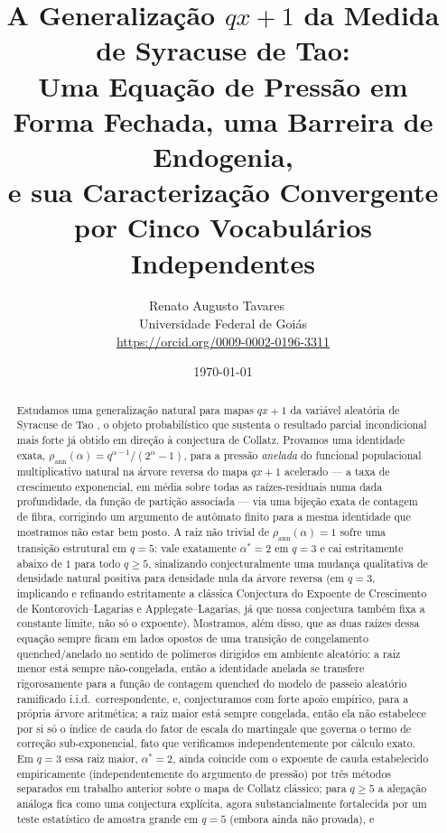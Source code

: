 \documentclass[11pt]{article}
\title{A Generalização $qx+1$ da Medida de Syracuse de Tao:\\
Uma Equação de Pressão em Forma Fechada, uma Barreira de Endogenia,\\
e sua Caracterização Convergente por Cinco Vocabulários Independentes}
\author{Renato Augusto Tavares~{\small\href{mailto:dr.renatotavares@gmail.com}{\textcolor{black}{\faEnvelope}}}~\orcidlink{0009-0002-0196-3311}\\
\normalsize Universidade Federal de Goiás\\
\small \href{https://orcid.org/0009-0002-0196-3311}{https://orcid.org/0009-0002-0196-3311}}
\date{\today}
\theoremstyle{definition}
\theoremstyle{remark}
\begin{document}
\maketitle

\begin{abstract}
Estudamos uma generalização natural para mapas $qx+1$ da variável
aleatória de Syracuse de Tao \cite{Tao2022}, o objeto probabilístico
que sustenta o resultado parcial incondicional mais forte já obtido em
direção à conjectura de Collatz. Provamos uma identidade exata, $\rho_{\mathrm{ann}}(\alpha) =
q^{\alpha-1}/(2^\alpha-1)$, para a pressão \emph{anelada} do funcional
populacional multiplicativo natural na árvore reversa do mapa $qx+1$
acelerado --- a taxa de crescimento exponencial, em média sobre todas
as raízes-residuais numa dada profundidade, da função de partição
associada --- via uma bijeção exata de contagem de fibra, corrigindo
um argumento de autômato finito para a mesma identidade que mostramos
não estar bem posto. A raiz não trivial de $\rho_{\mathrm{ann}}(\alpha)=1$
sofre uma transição estrutural em $q=5$: vale exatamente $\alpha^\ast=2$
em $q=3$ e cai estritamente abaixo de $1$ para todo $q\ge5$,
sinalizando conjecturalmente uma mudança qualitativa de densidade
natural positiva para densidade nula da árvore reversa (em $q=3$,
implicando e refinando estritamente a clássica Conjectura do Expoente
de Crescimento de Kontorovich--Lagarias e Applegate--Lagarias, já que
nossa conjectura também fixa a constante limite, não só o expoente).
Mostramos, além disso, que as duas raízes dessa
equação sempre ficam em lados opostos de uma transição de congelamento
quenched/anelado no sentido de polímeros dirigidos em ambiente
aleatório: a raiz menor está sempre não-congelada, então a identidade
anelada se transfere rigorosamente para a função de contagem quenched
do modelo de passeio aleatório ramificado i.i.d.\ correspondente, e,
conjecturamos com forte apoio empírico, para a própria árvore
aritmética; a raiz maior está sempre congelada, então ela
não estabelece por si só o índice de cauda do fator de escala do
martingale que governa o termo de correção sub-exponencial, fato que
verificamos independentemente por cálculo exato. Em $q=3$ essa raiz
maior, $\alpha^\ast=2$, ainda coincide com o expoente de cauda
estabelecido empiricamente (independentemente do argumento de pressão)
por três métodos separados em trabalho anterior sobre o mapa de
Collatz clássico; para $q\ge5$ a alegação análoga fica como uma
conjectura explícita, agora substancialmente fortalecida por um teste
estatístico de amostra grande em $q=5$ (embora ainda não provada), e

\end{abstract}
\end{document}
